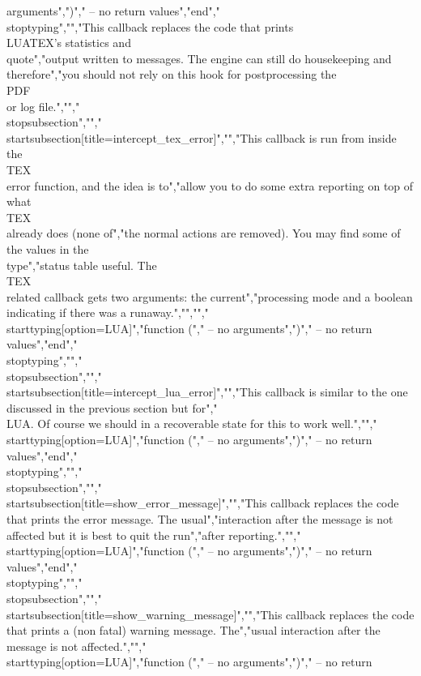 arguments",")","    -- no return values","end","\\stoptyping","","This callback replaces the code that prints \\LUATEX's statistics and \\quote","{output written to} messages. The engine can still do housekeeping and therefore","you should not rely on this hook for postprocessing the \\PDF\\ or log file.","","\\stopsubsection","","\\startsubsection[title=intercept_tex_error]","","This callback is run from inside the \\TEX\\ error function, and the idea is to","allow you to do some extra reporting on top of what \\TEX\\ already does (none of","the normal actions are removed). You may find some of the values in the \\type","{status} table useful. The \\TEX\\ related callback gets two arguments: the current","processing mode and a boolean indicating if there was a runaway.","","","\\starttyping[option=LUA]","function (","    -- no arguments",")","    -- no return values","end","\\stoptyping","","\\stopsubsection","","\\startsubsection[title=intercept_lua_error]","","This callback is similar to the one discussed in the previous section but for","\\LUA. Of course we should in a recoverable state for this to work well.","","\\starttyping[option=LUA]","function (","    -- no arguments",")","    -- no return values","end","\\stoptyping","","\\stopsubsection","","\\startsubsection[title=show_error_message]","","This callback replaces the code that prints the error message. The usual","interaction after the message is not affected but it is best to quit the run","after reporting.","","\\starttyping[option=LUA]","function (","    -- no arguments",")","    -- no return values","end","\\stoptyping","","\\stopsubsection","","\\startsubsection[title=show_warning_message]","","This callback replaces the code that prints a (non fatal) warning message. The","usual interaction after the message is not affected.","","\\starttyping[option=LUA]","function (","    -- no arguments",")","    -- no return 